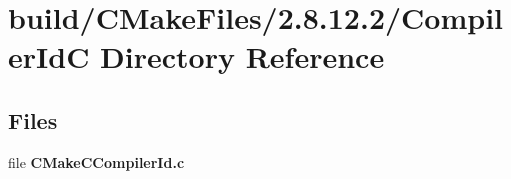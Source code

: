 \section{build/\-C\-Make\-Files/2.8.12.2/\-Compiler\-Id\-C Directory Reference}
\label{dir_810fa0f3751972e5d9f41a4c273724ff}
\subsection*{Files}
\begin{DoxyCompactItemize}
\item 
file {\bf C\-Make\-C\-Compiler\-Id.\-c}
\end{DoxyCompactItemize}
